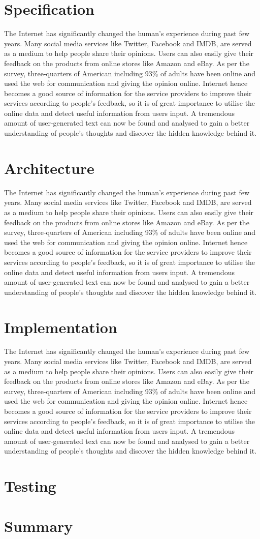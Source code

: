 \documentclass[a4paper,11pt]{article}
\begin{document}
\section{Specification}
The Internet has significantly changed the human's experience during past few years. Many social media services like Twitter, Facebook and IMDB, are served as a medium to help people share their opinions. Users can also easily give their feedback on the products from online stores like Amazon and eBay. As per the survey, three-quarters of American including 93\% of adults have been online and used the web for communication and giving the opinion online. Internet hence becomes a good source of information for the service providers to improve their services according to people's feedback, so it is of great importance to utilise the online data and detect useful information from users input. A tremendous amount of user-generated text can now be found and analysed to gain a better understanding of people's thoughts and discover the hidden knowledge behind it.

\section{Architecture}
The Internet has significantly changed the human's experience during past few years. Many social media services like Twitter, Facebook and IMDB, are served as a medium to help people share their opinions. Users can also easily give their feedback on the products from online stores like Amazon and eBay. As per the survey, three-quarters of American including 93\% of adults have been online and used the web for communication and giving the opinion online. Internet hence becomes a good source of information for the service providers to improve their services according to people's feedback, so it is of great importance to utilise the online data and detect useful information from users input. A tremendous amount of user-generated text can now be found and analysed to gain a better understanding of people's thoughts and discover the hidden knowledge behind it.

\section{Implementation}
The Internet has significantly changed the human's experience during past few years. Many social media services like Twitter, Facebook and IMDB, are served as a medium to help people share their opinions. Users can also easily give their feedback on the products from online stores like Amazon and eBay. As per the survey, three-quarters of American including 93\% of adults have been online and used the web for communication and giving the opinion online. Internet hence becomes a good source of information for the service providers to improve their services according to people's feedback, so it is of great importance to utilise the online data and detect useful information from users input. A tremendous amount of user-generated text can now be found and analysed to gain a better understanding of people's thoughts and discover the hidden knowledge behind it.

\section{Testing}
\section{Summary}


\end{document}
